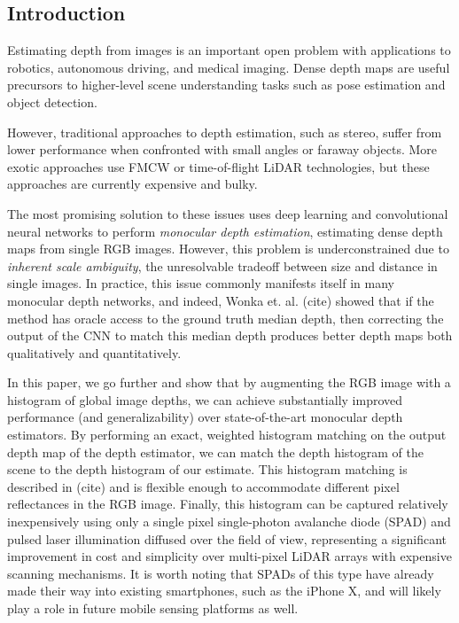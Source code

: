 \subsection{Introduction}
Estimating depth from images is an important open problem with applications
to robotics, autonomous driving, and medical imaging. Dense depth maps are
useful precursors to higher-level scene understanding tasks such as pose
estimation and object detection.

However, traditional approaches to depth estimation, such as stereo, suffer from lower performance
when confronted with small angles or faraway objects.
More exotic approaches use FMCW or time-of-flight LiDAR technologies,
but these approaches are currently expensive and bulky. 

The most promising solution to these issues uses deep learning and 
convolutional neural networks to perform \textit{monocular depth estimation},
estimating dense depth maps from single RGB images. 
However, this problem is underconstrained due to \textit{inherent scale ambiguity}, the unresolvable
tradeoff between size and distance in single images. In practice, this issue commonly
manifests itself in many monocular depth networks, and indeed, 
Wonka et. al. (cite) showed that if the method has oracle access to the ground truth
median depth, then correcting the output of the CNN to match this median
depth produces better depth maps both qualitatively and quantitatively.

In this paper, we go further and show that by augmenting the RGB image with a histogram of
global image depths, we can achieve substantially improved performance
(and generalizability) over state-of-the-art monocular depth
estimators. By performing an exact, weighted histogram matching on the output
depth map of the depth estimator, we can match the depth histogram of the scene
to the depth histogram of our estimate. This histogram matching is described in
(cite) and is flexible enough to accommodate different pixel reflectances in the
RGB image. Finally, this histogram can be captured
relatively inexpensively using only a single pixel single-photon avalanche diode
(SPAD) and pulsed laser illumination diffused over the field of view, 
representing a significant improvement in cost and simplicity over multi-pixel LiDAR
arrays with expensive scanning mechanisms. It is
worth noting that SPADs of this type have already made their way into existing
smartphones, such as the iPhone X, and will likely play a role in future mobile sensing platforms as well.


